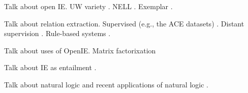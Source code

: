 Talk about open IE.
UW variety \cite{key:2007yates-textrunner,key:2011fader-reverb,key:2012mausam-ollie}.
NELL \cite{key:2010carlson-nell}.
Exemplar \cite{key:2013mesquita2013-exemplar}.

Talk about relation extraction.
Supervised (e.g., the ACE datasets)
  \cite{key:2004doddington-ace,key:2005zhou-ace,key:2007surdeanu-ace}.
Distant supervision 
  \cite{key:1999craven-distsup,key:2007wu-distsup,key:2009mintz-distsup,key:2011sun-kbp}.
Rule-based systems
  \cite{key:1997soderland-kbp,key:2010grishman-kbp,key:2010chen-kbp}.

Talk about uses of OpenIE.
Matrix factorixation \cite{key:2012yao-schemas,key:2013riedel-schemas}

Talk about IE as entailment \cite{key:2006romano-ie}.

Talk about natural logic
  \cite{key:2008vanbenthem-natlog,key:2014icard-natlog}
and recent applications of natural logic
  \cite{key:2009maccartney-natlog,key:2013bowman-natlog,key:2013angeli-truth}.
